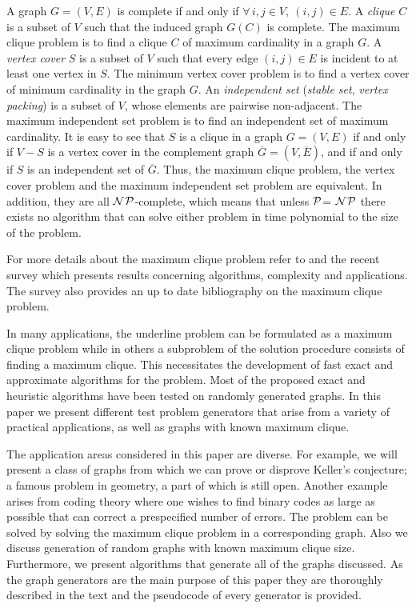 A graph $G = (V,E)$ is complete if and only if $\forall\, i,j\in V,\ (i,j)\in E$.
A {\em clique} $C$ is a subset of $V$ such that the induced graph $G(C)$ is
complete. The maximum clique problem is to find a clique $C$ of
maximum cardinality in a graph $G$.
A {\em vertex cover} $S$ is a subset of $V$ such that every edge $(i,j)\in
E$ is incident to at least one vertex in $S$. The minimum vertex cover
problem is to find a vertex cover of minimum cardinality in the graph $G$.
An {\em independent set} ({\em stable set}, {\em vertex packing}) is a
subset of $V$, whose elements are pairwise non-adjacent. The maximum
independent set problem is to find an independent set of maximum cardinality.
It is easy to see that $S$ is a clique in a graph $G = (V,E)$ if and
only if $V-S$ is a vertex cover in the complement graph $\overline{G}
= (V,\overline{E})$, and if and only if $S$ is an independent set of
$\overline{G}$. Thus, the maximum clique problem, the vertex cover problem and
the maximum independent set problem are equivalent. In addition, they
are all $\cal N$$\cal P$-complete, which means that unless $\cal P$=
$\cal N$$\cal P$ there exists no algorithm that can solve either problem in
time polynomial to the size of the problem.

For more details about the maximum clique problem refer to 
\cite{BX,BY,CP,PR,X} and the
recent survey \cite{PX} which presents results concerning
algorithms, complexity and applications. The survey also provides an up
to date bibliography on the maximum clique problem.

In many applications, the underline problem can be formulated as
a maximum clique problem while in others a subproblem of the solution
procedure consists of finding a maximum clique. This necessitates the
development of fast exact and approximate algorithms for the problem.
Most of the proposed exact and heuristic algorithms have been tested on
randomly generated graphs. In this paper we present different test problem
generators that arise from a variety of practical applications, as well as
graphs with known maximum clique.

The application areas considered in this paper are diverse. For example, we
will present a class of graphs from which we can prove or disprove
Keller's conjecture; a famous problem in geometry, a part of which is still
open. Another example arises from coding theory where one
wishes to find binary codes as large as possible that can correct a
prespecified number of errors. The problem can be solved by solving the
maximum clique problem in a corresponding graph.
Also we discuss generation of random graphs with known maximum clique
size. Furthermore, we present algorithms that generate
all of the graphs discussed. As the graph generators are the main
purpose of this paper they are thoroughly described in the text and the
pseudocode of every generator is provided.


